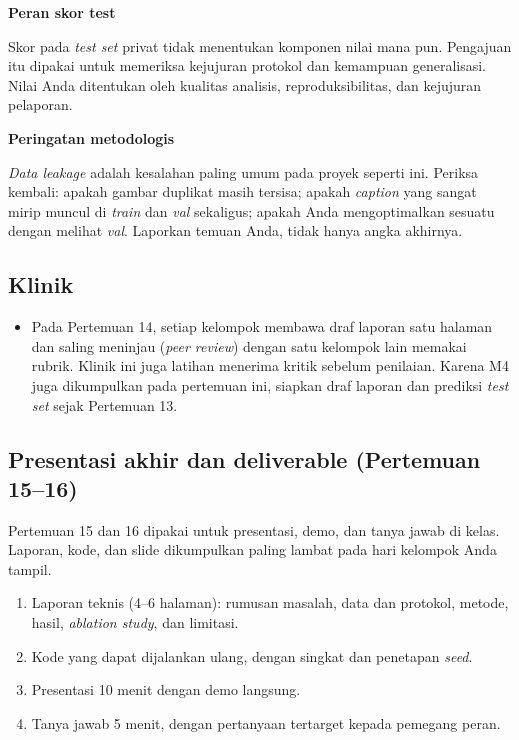 \documentclass[12pt, a4paper]{article}
\begin{document}
\begin{callout}[ctpMauve]
\textbf{\color{ctpMauve}Peran skor test}
\par\smallskip
Skor pada \emph{test set} privat tidak menentukan komponen nilai mana pun. Pengajuan itu dipakai untuk memeriksa kejujuran protokol dan kemampuan generalisasi. Nilai Anda ditentukan oleh kualitas analisis, reproduksibilitas, dan kejujuran pelaporan.
\end{callout}

\begin{callout}[ctpPeach]
\textbf{\color{ctpPeach}Peringatan metodologis}
\par\smallskip
\emph{Data leakage} adalah kesalahan paling umum pada proyek seperti ini. Periksa kembali: apakah gambar duplikat masih tersisa; apakah \emph{caption} yang sangat mirip muncul di \emph{train} dan \emph{val} sekaligus; apakah Anda mengoptimalkan sesuatu dengan melihat \emph{val}. Laporkan temuan Anda, tidak hanya angka akhirnya.
\end{callout}

\subsection{Klinik}

\begin{itemize}
  \item Pada Pertemuan 14, setiap kelompok membawa draf laporan satu halaman dan saling meninjau (\emph{peer review}) dengan satu kelompok lain memakai rubrik. Klinik ini juga latihan menerima kritik sebelum penilaian. Karena M4 juga dikumpulkan pada pertemuan ini, siapkan draf laporan dan prediksi \emph{test set} sejak Pertemuan 13.
\end{itemize}
\subsection{Presentasi akhir dan deliverable (Pertemuan 15--16)}

Pertemuan 15 dan 16 dipakai untuk presentasi, demo, dan tanya jawab di kelas. Laporan, kode, dan slide dikumpulkan paling lambat pada hari kelompok Anda tampil.

\begin{enumerate}
  \item Laporan teknis (4--6 halaman): rumusan masalah, data dan protokol, metode, hasil, \emph{ablation study}, dan limitasi.
  \item Kode yang dapat dijalankan ulang, dengan  singkat dan penetapan \emph{seed}.
  \item Presentasi 10 menit dengan demo langsung.
  \item Tanya jawab 5 menit, dengan pertanyaan tertarget kepada pemegang peran.
\end{enumerate}
\end{document}
